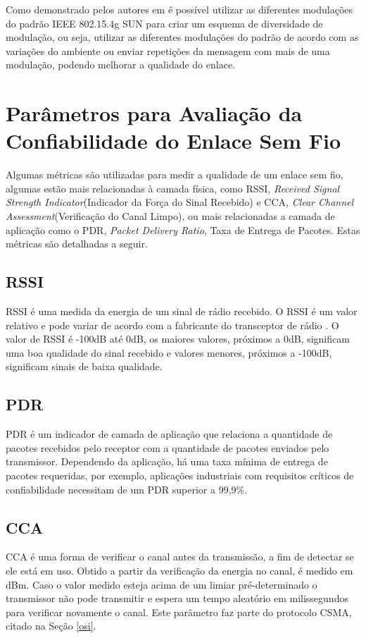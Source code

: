 Como demonstrado pelos autores em \cite{gomes2020improving} é possível utilizar as diferentes modulações do padrão IEEE 802.15.4g SUN para criar um esquema de diversidade de modulação, ou seja, utilizar as diferentes modulações do padrão de acordo com as variações do ambiente ou enviar repetições da mensagem com mais de uma modulação, podendo melhorar a qualidade do enlace.

\section{Parâmetros para Avaliação da Confiabilidade do Enlace Sem Fio}
\label{paramSF}
Algumas métricas são utilizadas para medir a qualidade de um enlace sem fio, algumas estão mais relacionadas à camada física, como RSSI, \emph{Received Signal Strength Indicator}(Indicador da Força do Sinal Recebido) e CCA, \emph{Clear Channel Assessment}(Verificação do Canal Limpo), ou mais relacionadas a camada de aplicação como o PDR, \emph{Packet Delivery Ratio}, Taxa de Entrega de Pacotes. Estas métricas são detalhadas a seguir.

\subsection*{RSSI}
RSSI é uma medida da energia de um sinal de rádio recebido. O RSSI é um valor relativo e pode variar de acordo com a fabricante do transceptor de rádio \cite{UNDERSTANDING_RSSI}. O valor de RSSI é -100dB até 0dB, os maiores valores, próximos a 0dB, significam uma boa qualidade do sinal recebido e valores menores, próximos a -100dB, significam sinais de baixa qualidade.

\subsection*{PDR}
PDR é um indicador de camada de aplicação que relaciona a quantidade de pacotes recebidos pelo receptor com a quantidade de pacotes enviados pelo transmissor. Dependendo da aplicação, há uma taxa mínima de entrega de pacotes requeridas, por exemplo, aplicações industriais com requisitos críticos de confiabilidade necessitam de um PDR superior a 99,9\%.

\subsection*{CCA}
CCA é uma forma de verificar o canal antes da transmissão, a fim de detectar se ele está em uso. Obtido a partir da verificação da energia no canal, é medido em dBm. Caso o valor medido esteja acima de um limiar pré-determinado o transmissor não pode transmitir e espera um tempo aleatório em milissegundos para verificar novamente o canal. Este parâmetro faz parte do protocolo CSMA, citado na Seção \ref{osi}.

